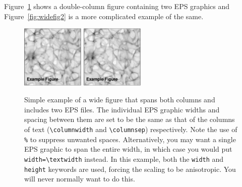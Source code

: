\documentclass[proceedings, preprint]{rmaa}
\newcommand{\CS}[1]{\texttt{\textbackslash #1}}
\begin{document}
Figure~\ref{fig:widefig1} shows a double-column figure containing two
EPS graphics and Figure~\ref{fig:widefig2} is a more complicated
example of the same. 

\begin{figure}[!t]
  \includegraphics[width=\columnwidth,height=3cm]{example-fig}%
  \hspace*{\columnsep}%
  \includegraphics[width=\columnwidth,height=3cm]{example-fig}
  \caption{Simple example of a wide figure that spans both
    columns and includes two EPS files. The individual EPS graphic
    widths and spacing between them are set to be the same as that of
    the columns of text (\CS{columnwidth} and \CS{columnsep})
    respectively. Note the use of \texttt{\%} to suppress unwanted
    spaces. Alternatively, you may want a single EPS graphic to span
    the entire width, in which case you would put
    \texttt{width=\CS{textwidth}} instead. In this example, both the
    \texttt{width} and \texttt{height} keywords are used, forcing the
    scaling to be anisotropic. You will never normally want to do
    this.}
  \label{fig:widefig1}
\end{figure}
\end{document}
